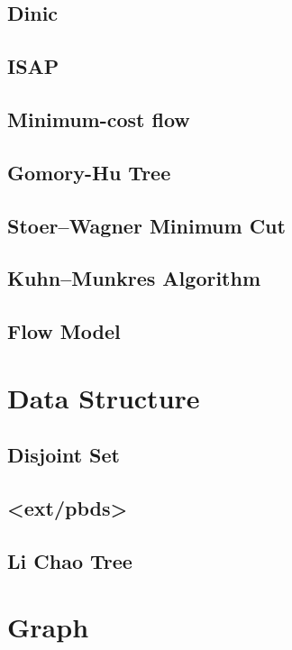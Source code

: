 \documentclass[a4paper,10pt,twocolumn,oneside]{article}
\begin{document}
\subsection{Dinic}

\subsection{ISAP}

\subsection{Minimum-cost flow}

\subsection{Gomory-Hu Tree}

\subsection{Stoer–Wagner Minimum Cut}

\subsection{Kuhn–Munkres Algorithm}

\subsection{Flow Model}

\section{Data Structure}
\subsection{Disjoint Set}

\subsection{<ext/pbds>}

\subsection{Li Chao Tree}

\section{Graph}
\end{document}
